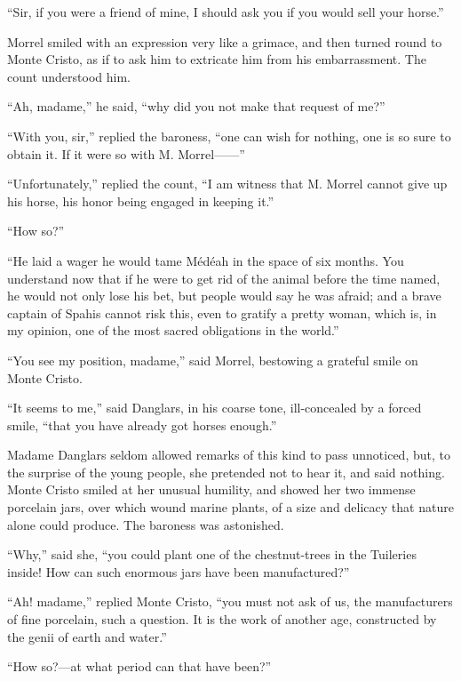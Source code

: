“Sir, if you were a friend of mine, I should ask you if you would sell
your horse.”

Morrel smiled with an expression very like a grimace, and then turned
round to Monte Cristo, as if to ask him to extricate him from his
embarrassment. The count understood him.

“Ah, madame,” he said, “why did you not make that request of me?”

“With you, sir,” replied the baroness, “one can wish for nothing, one
is so sure to obtain it. If it were so with M. Morrel——”

“Unfortunately,” replied the count, “I am witness that M. Morrel cannot
give up his horse, his honor being engaged in keeping it.”

“How so?”

“He laid a wager he would tame Médéah in the space of six months. You
understand now that if he were to get rid of the animal before the time
named, he would not only lose his bet, but people would say he was
afraid; and a brave captain of Spahis cannot risk this, even to gratify
a pretty woman, which is, in my opinion, one of the most sacred
obligations in the world.”

“You see my position, madame,” said Morrel, bestowing a grateful smile
on Monte Cristo.

“It seems to me,” said Danglars, in his coarse tone, ill-concealed by a
forced smile, “that you have already got horses enough.”

Madame Danglars seldom allowed remarks of this kind to pass unnoticed,
but, to the surprise of the young people, she pretended not to hear it,
and said nothing. Monte Cristo smiled at her unusual humility, and
showed her two immense porcelain jars, over which wound marine plants,
of a size and delicacy that nature alone could produce. The baroness
was astonished.

“Why,” said she, “you could plant one of the chestnut-trees in the
Tuileries inside! How can such enormous jars have been manufactured?”

“Ah! madame,” replied Monte Cristo, “you must not ask of us, the
manufacturers of fine porcelain, such a question. It is the work of
another age, constructed by the genii of earth and water.”

“How so?—at what period can that have been?”


